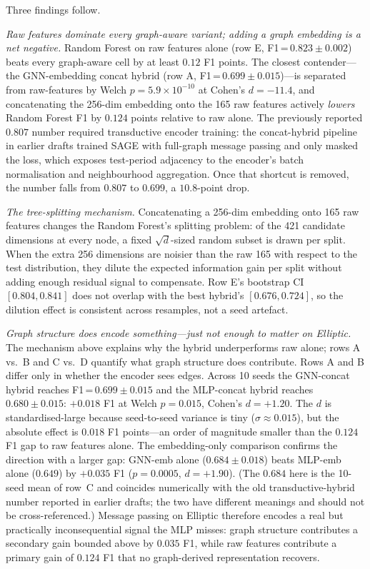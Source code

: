 Three findings follow.

\textit{Raw features dominate every graph-aware variant; adding a
graph embedding is a net negative.}  Random Forest on raw features
alone (row E, F1\,=\,$0.823 \pm 0.002$) beats every graph-aware cell
by at least $0.12$ F1 points.  The closest contender---the
GNN-embedding concat hybrid (row A, F1\,=\,$0.699 \pm 0.015$)---is
separated from raw-features by Welch $p = 5.9 \times 10^{-10}$ at
Cohen's $d = -11.4$, and concatenating the 256-dim embedding onto
the 165 raw features actively \emph{lowers} Random Forest F1 by
$0.124$ points relative to raw alone.  The previously reported
$0.807$ number required transductive encoder training: the
concat-hybrid pipeline in earlier drafts trained SAGE with
full-graph message passing and only masked the loss, which exposes
test-period adjacency to the encoder's batch normalisation and
neighbourhood aggregation.  Once that shortcut is removed, the
number falls from $0.807$ to $0.699$, a $10.8$-point drop.

\textit{The tree-splitting mechanism.}  Concatenating a 256-dim
embedding onto 165 raw features changes the Random Forest's
splitting problem: of the 421 candidate dimensions at every node, a
fixed $\sqrt{d}$-sized random subset is drawn per split.  When the
extra 256 dimensions are noisier than the raw 165 with respect to
the test distribution, they dilute the expected information gain
per split without adding enough residual signal to compensate.  Row
E's bootstrap CI $[0.804, 0.841]$ does not overlap with the best
hybrid's $[0.676, 0.724]$, so the dilution effect is consistent
across resamples, not a seed artefact.

\textit{Graph structure does encode something---just not enough to
matter on Elliptic.}  The mechanism above explains why the hybrid
underperforms raw alone; rows A vs.\ B and C vs.\ D quantify what
graph structure does contribute.  Rows A and B differ only in
whether the encoder sees edges.  Across 10 seeds the GNN-concat
hybrid reaches F1\,=\,$0.699 \pm 0.015$ and the MLP-concat hybrid
reaches $0.680 \pm 0.015$: $+0.018$ F1 at Welch $p = 0.015$,
Cohen's $d = +1.20$.  The $d$ is standardised-large because
seed-to-seed variance is tiny ($\sigma \approx 0.015$), but the
absolute effect is $0.018$ F1 points---an order of magnitude
smaller than the $0.124$ F1 gap to raw features alone.  The
embedding-only comparison confirms the direction with a larger gap:
GNN-emb alone ($0.684 \pm 0.018$) beats MLP-emb alone ($0.649$) by
$+0.035$ F1 ($p = 0.0005$, $d = +1.90$).  (The $0.684$ here is the
10-seed mean of row~C and coincides numerically with the old
transductive-hybrid number reported in earlier drafts; the two have
different meanings and should not be cross-referenced.)  Message
passing on Elliptic therefore encodes a real but practically
inconsequential signal the MLP misses: graph structure contributes
a secondary gain bounded above by $0.035$ F1, while raw features
contribute a primary gain of $0.124$ F1 that no
graph-derived representation recovers.

